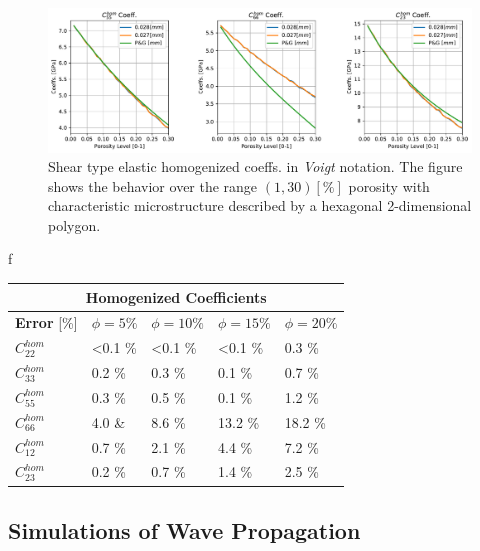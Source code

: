 \begin{figure}[!h]
	\centering
	\includegraphics[scale=.5]{images/CellsProb/CellProb_OthersHomCoeffsCircularHexa.pdf}
	\caption{Shear type elastic homogenized coeffs. in \textit{Voigt} notation. The figure shows the behavior over the range $(1,30) [\%]$ porosity with characteristic microstructure described by a hexagonal 2-dimensional polygon.}
	\label{OtherHomCoeffsHexagonal}
\end{figure}
f
\begin{center}
\begin{tabular}{ |p{2.2cm}||p{2cm}|p{2cm}|p{2cm}|p{2cm}| }
 \hline
 \multicolumn{5}{|c|}{\textbf{Homogenized Coefficients}} \\
 \hline
 \textbf{Error} [\%] & $\phi = 5 \%$ & $\phi = 10 \%$ & $\phi = 15 \%$ & $\phi = 20 \%$ \\
 \hline
 $C^{hom}_{22}$ & <0.1 \% & <0.1 \% & <0.1 \% & 0.3 \% \\
 $C^{hom}_{33}$ & 0.2 \% & 0.3 \% & 0.1 \% & 0.7 \% \\
 $C^{hom}_{55}$ & 0.3 \% & 0.5 \% & 0.1 \% & 1.2 \% \\
 $C^{hom}_{66}$ & 4.0 \& & 8.6 \% & 13.2 \% & 18.2 \% \\
 $C^{hom}_{12}$ & 0.7 \% & 2.1 \% & 4.4 \% & 7.2 \% \\
 $C^{hom}_{23}$ & 0.2 \% & 0.7 \% & 1.4 \% & 2.5 \% \\
 \hline
\end{tabular}
\end{center}


\subsection{Simulations of Wave Propagation}

